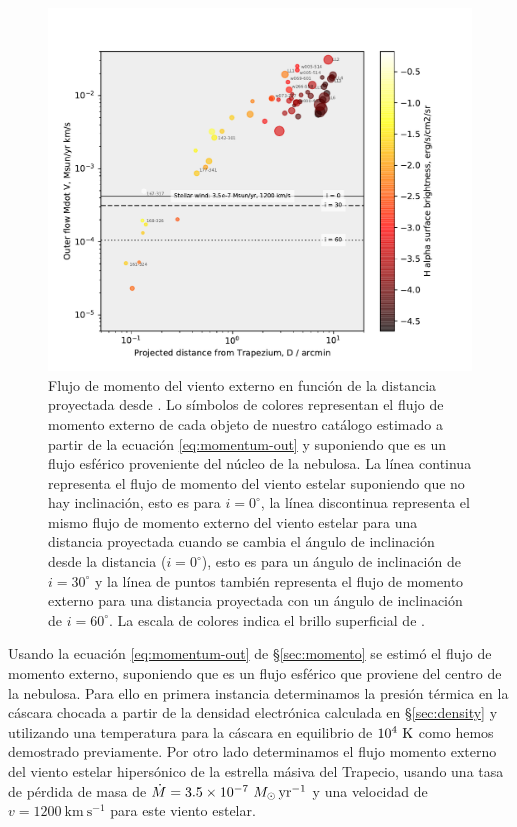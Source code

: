 \begin{figure}
  \centering
  \includegraphics[width=\linewidth, clip]{luis-programas/will-MdotVout-vs-D.pdf}
  \caption{Flujo de momento del viento externo en función de la distancia proyectada desde \thC{}. Lo símbolos de colores representan el flujo de momento externo de cada objeto de nuestro catálogo estimado a partir de la ecuación \ref{eq:momentum-out} y suponiendo que es un flujo esférico proveniente del núcleo de la nebulosa. La línea continua representa el flujo de momento del viento estelar  suponiendo que no hay inclinación, esto es para \(i = 0^{\circ}\), la línea discontinua representa el mismo flujo de momento externo del viento estelar para una distancia proyectada cuando se cambia el ángulo de inclinación desde la distancia (\(i = 0^{\circ}\)), esto es para un ángulo de inclinación de \(i = 30^{\circ}\) y la línea de puntos también representa el flujo de momento externo para una distancia proyectada con un ángulo de inclinación de \(i = 60^{\circ}\). La escala de colores indica el brillo superficial de \ha{}.}
 \label{fig:pressure}
\end{figure}

Usando la ecuación \ref{eq:momentum-out} de \S\ref{sec:momento} se estimó el flujo de momento externo, suponiendo que es un flujo esférico que proviene del centro de la nebulosa. Para ello en primera instancia determinamos la presión térmica en la cáscara chocada a partir de la densidad electrónica calculada en \S\ref{sec:density} y utilizando una temperatura para la cáscara en equilibrio de \(10^{4}~\mathrm{K}\) como hemos demostrado previamente. Por otro lado determinamos el flujo momento externo del viento estelar hipersónico de la estrella másiva \thC{} del Trapecio, usando una tasa de pérdida de masa de \(\dot{M} = 3.5 \times 10^{-7}~M_\odot\,\mathrm{yr^{-1}}\) y una velocidad de \(v = 1200~\mathrm{km~s^{-1}}\) para este viento estelar. \\

